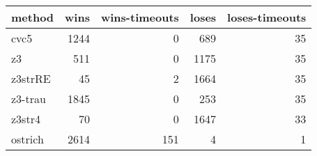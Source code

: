 \begin{tabular}{lrrrr}
\hline
 method   &   wins &   wins-timeouts &   loses &   loses-timeouts \\
\hline
 cvc5     &   1244 &               0 &     689 &               35 \\
 z3       &    511 &               0 &    1175 &               35 \\
 z3strRE  &     45 &               2 &    1664 &               35 \\
 z3-trau  &   1845 &               0 &     253 &               35 \\
 z3str4   &     70 &               0 &    1647 &               33 \\
 ostrich  &   2614 &             151 &       4 &                1 \\
\hline
\end{tabular}
